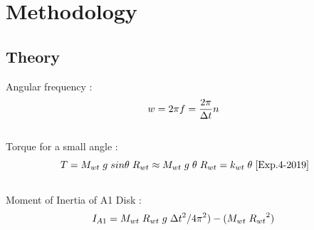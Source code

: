 \documentclass[12pt]{article}
\begin{document}
\section{Methodology}
\label{Methodology Section}
\subsection{Theory}
\label{Theory Section}

Angular frequency \cite{Exp.4-2019}:
\begin{equation}
 \centering
 w = 2{\pi}f = \dfrac{2{\pi}}{{\Delta}t}n \hspace{0.1cm}
 \label{Angular Frequency Eq}
\end{equation} \\

Torque for a small angle \cite{Exp.4-2019}:
\begin{equation}
 \centering
 T = M_{wt}\hspace{0.1cm} g \hspace{0.1cm} sin{\theta} \hspace{0.1cm} R_{wt} \approx M_{wt} \hspace{0.1cm} g \hspace{0.1cm} {\theta} \hspace{0.1cm} R_{wt} = k_{wt} \hspace{0.1cm} \theta \hspace{0.1cm}\cite{Exp.4-2019}
 \label{Torque for a small angle Eq}
\end{equation} \\

Moment of Inertia of A1 Disk \cite{Exp.4-2019}:
\begin{equation}
 \centering
 I_{A1} = M_{wt}\hspace{0.1cm} R_{wt}\hspace{0.1cm} g\hspace{0.1cm} {\Delta}t^2/{4\pi^2}) - (M_{wt}\hspace{0.1cm} {R_{wt}}^2) \hspace{0.1cm}
 \label{Moment of Inertia of A1 Disk Eq}
\end{equation} \\
\end{document}

